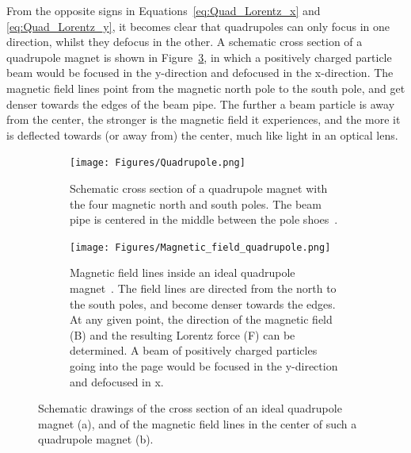 From the opposite signs in Equations~\ref{eq:Quad_Lorentz_x} and \ref{eq:Quad_Lorentz_y}, it becomes clear that quadrupoles can only focus in one direction, whilst they defocus in the other.
A schematic cross section of a quadrupole magnet is shown in Figure~\ref{fig:Quadrupole}, in which a positively charged particle beam would be focused in the y-direction and defocused in the x-direction. 
The magnetic field lines point from the magnetic north pole to the south pole, and get denser towards the edges of the beam pipe.
The further a beam particle is away from the center, the stronger is the magnetic field it experiences, and the more it is deflected towards (or away from) the center, much like light in an optical lens.
\begin{figure}
\begin{subfigure}[t]{0.49\textwidth}
\centering
 \texttt{[image: Figures/Quadrupole.png]}
\caption[Cross-section of a quadrupole magnet]{Schematic cross section of a quadrupole magnet with the four magnetic north and south poles.
The beam pipe is centered in the middle between the pole shoes~\cite[p. 88]{Hinterberger}.}
\label{fig:Quadrupole:cross_section}
\end{subfigure}\hfill
\begin{subfigure}[t]{0.49\textwidth}
\centering
 \texttt{[image: Figures/Magnetic\_field\_quadrupole.png]}
\caption[Magnetic field in an ideal quadrupole magnet]{Magnetic field lines inside an ideal quadrupole magnet~\cite{QuadrupoleField}.
The field lines are directed from the north to the south poles, and become denser towards the edges.
At any given point, the direction of the magnetic field (B) and the resulting Lorentz force (F) can be determined.
A beam of positively charged particles going into the page would be focused in the y-direction and defocused in x.}
\label{fig:Quadrupole:field_lines}
\end{subfigure}
\caption[Schematic drawings of a quadrupole magnet]{Schematic drawings of the cross section of an ideal quadrupole magnet (a), and of the magnetic field lines in the center of such a quadrupole magnet (b).}
\label{fig:Quadrupole}
\end{figure}

